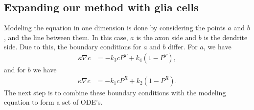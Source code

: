 \subsection{Expanding our method with glia cells}
Modeling the equation in one dimension is done by considering the points $a$ and $b$, and the line between them.  In this case, $a$ is the axon side and $b$ is the dendrite side.  Due to this, the boundary conditions for $a$ and $b$ differ.  For $a$, we have 
\begin{align*}
\kappa \nabla c &= -{k}_3cP^T + {k}_4(1-P^T),
\end{align*}
and for $b$ we have
\begin{align*}
\kappa \nabla c &= -{k}_1c P^R + {k}_2(1-P^R).
\end{align*}
The next step is to combine these boundary conditions with the modeling equation to form a set of ODE's.


